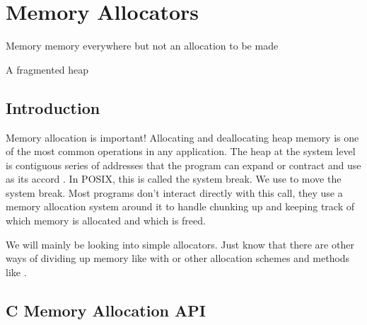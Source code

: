 \chapter{Memory Allocators}

\epigraph{Memory memory everywhere but not an allocation to be made}{A fragmented heap}

\section{Introduction}

Memory allocation is important!
Allocating and deallocating heap memory is one of the most common operations in any application.
The heap at the system level is contiguous series of addresses that the program can expand or contract and use as its accord \cite{mallocinternals}.
In POSIX, this is called the system break.
We use  to move the system break.
Most programs don't interact directly with this call, they use a memory allocation system around it to handle chunking up and keeping track of which memory is allocated and which is freed.

We will mainly be looking into simple allocators.
Just know that there are other ways of dividing up memory like with  or other allocation schemes and methods like .

\section{C Memory Allocation API}

